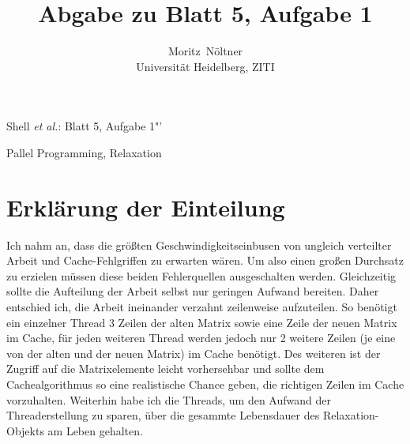\documentclass[10pt,compsoc, a4paper]{IEEEtran}
\begin{document}
\title{Abgabe zu Blatt 5, Aufgabe 1}

\author{Moritz~N\"oltner\\%
		Universität Heidelberg, ZITI}

%
{Shell \MakeLowercase{\textit{et al.}}: Blatt 5, Aufgabe 1"'}


\maketitle


\begin{IEEEkeywords}
Pallel Programming, Relaxation
\end{IEEEkeywords}

%
\IEEEpeerreviewmaketitle



\section{Erklärung der Einteilung}
Ich nahm an, dass die größten Geschwindigkeitseinbusen von ungleich verteilter Arbeit und Cache-Fehlgriffen zu erwarten wären. Um also einen großen Durchsatz zu erzielen müssen diese beiden Fehlerquellen ausgeschalten werden. Gleichzeitig sollte die Aufteilung der Arbeit selbst nur geringen Aufwand bereiten.
Daher entschied ich, die Arbeit ineinander verzahnt zeilenweise aufzuteilen. So benötigt ein einzelner Thread 3 Zeilen der alten Matrix sowie eine Zeile der neuen Matrix im Cache, für jeden weiteren Thread werden jedoch nur 2 weitere Zeilen (je eine von der alten und der neuen Matrix) im Cache benötigt. Des weiteren ist der Zugriff auf die Matrixelemente leicht vorhersehbar und sollte dem Cachealgorithmus so eine realistische Chance geben, die richtigen Zeilen im Cache vorzuhalten.
Weiterhin habe ich die Threads, um den Aufwand der Threaderstellung zu sparen, über die gesammte Lebensdauer des Relaxation-Objekts am Leben gehalten.
\end{document}
